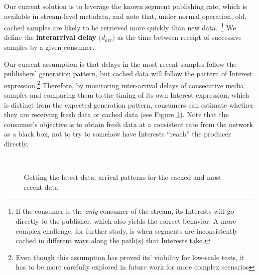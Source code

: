 \documentclass{icn/sig-alternate-2013} %
\begin{document}
Our current solution is to leverage the known segment publishing rate, which is available in stream-level metadata, and note that, under normal operation, old, cached samples are likely to be retrieved more quickly than new data.~\footnote{If the consumer is the \emph{only} consumer of the stream, its Interests will go directly to the publisher, which also yields the correct behavior. A more complex challenge, for further study, is when segments are inconsistently cached in different ways along the path(s) that Interests take.} We define the \textbf{interarrival delay} ($d_{arr}$) as the time between receipt of successive samples by a given consumer. 

Our current assumption is that delays in the most recent samples follow the publishers' generation pattern, but cached data will follow the pattern of Interest expression.\footnote{Even though this assumption has proved its' viability for low-scale tests, it has to be more carefully explored in future work for more complex scenarios} Therefore, by monitoring inter-arrival delays of consecutive media samples and comparing them to the timing of its own Interest expression, which is distinct from the expected generation pattern, consumers can estimate whether they are receiving fresh data or cached data (see Figure \ref{fig:inter-arrival}). Note that the consumer's objective is to obtain fresh data at a consistent rate from the network as a black box, not to try to somehow have Interests ``reach'' the producer directly.  



\begin{figure}[t!]
\centering

\\

\caption{Getting the latest data: arrival patterns for the cached and most recent data}
\label{fig:inter-arrival}
\end{figure}
\end{document}
